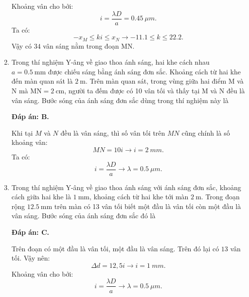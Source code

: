 \begin{enumerate}[label=\bfseries Câu \arabic*:]
{Khoảng vân cho bởi:
$$
	i = \dfrac{\lambda D}{a} = \SI{0,45}{\mu m}.
$$
Ta có:
$$
	-x_{M} \leq ki \leq x_{N} \rightarrow \num{-11,1} \leq k \leq \num{22,2}.
$$
Vậy có $ 34 $ vân sáng nằm trong đoạn MN.
	}
	
	\item {} 
	
	\cauhoi
	{Trong thí nghiệm Y-âng về giao thoa ánh sáng, hai khe cách nhau $a=\SI{0.5}{\milli \meter}$ được chiếu sáng bằng ánh sáng đơn sắc. Khoảng cách từ hai khe đến màn quan sát là $\SI{2}{\meter}$. Trên màn quan sát, trong vùng giữa hai điểm M và N mà $\text{MN}=\SI{2}{\centi \meter}$, người ta đếm được có 10 vân tối và thấy tại M và N đều là vân sáng. Bước sóng của ánh sáng đơn sắc dùng trong thí nghiệm này là
	}
	
	\loigiai
	{		\textbf{Đáp án: B.}
		
Khi tại $ M $ và $ N $ đều là vân sáng, thì số vân tối trên $ MN $ cũng chính là số khoảng vân:
$$
	MN = 10i \rightarrow i = \SI{2}{mm}.
$$
Ta có:
$$
	i = \dfrac{\lambda D}{a} \rightarrow \lambda = \SI{0,5}{\mu m}.
$$
		
	}
	
\item {}
	
	\cauhoi
	{Trong thí nghiệm Y-âng về giao thoa ánh sáng với ánh sáng đơn sắc, khoảng cách giữa hai khe là $\SI{1}{\milli \meter}$, khoảng cách từ hai khe tới màn $\SI{2}{\meter}$. Trong đoạn rộng $\SI{12.5}{\milli \meter}$ trên màn có 13 vân tối biết một đầu là vân tối còn một đầu là vân sáng. Bước sóng của ánh sáng đơn sắc đó là
	}
	
	\loigiai
	{		\textbf{Đáp án: C.}
		
Trên đoạn có một đầu là vân tối, một đầu là vân sáng. Trên đó lại có $ 13 $ vân tối. Vậy nên:
$$
	\Delta d = 12,5i \rightarrow i = \SI{1}{mm}.
$$
Khoảng vân cho bởi:
$$
	i = \dfrac{\lambda D}{a} \rightarrow \lambda = \SI{0,5}{\mu m}.
$$
		
}
\end{enumerate}

